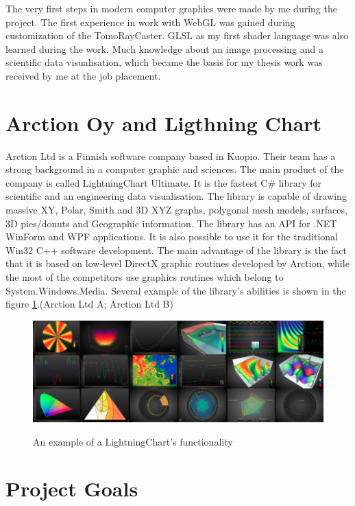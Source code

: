\documentclass[twoside, english, 11pt]{report}
\begin{document}
The very first steps in modern computer graphics were made by me during the project. The first experience in work with WebGL was gained during customization of the TomoRayCaster. GLSL as my first shader language was also learned during the work. Much knowledge about an image processing and a scientific data visualisation, which became the basis for my thesis work was received by me at the job placement.


\section{Arction Oy and Ligthning Chart}

Arction Ltd is a Finnish software company based in Kuopio. Their team has a strong background in a computer graphic and sciences. The main product of the company is called LightningChart Ultimate. It is the fastest C\# library for scientific and an engineering data visualisation. The library is capable of drawing massive XY, Polar, Smith and 3D XYZ graphs, polygonal mesh models, surfaces, 3D pies/donuts and Geographic information. The library has an API for .NET WinForm and WPF applications. It is also possible to use it for the traditional Win32 C++ software development. The main advantage of the library is the fact that it is based on low-level DirectX graphic routines developed by Arction, while the most of the competitors use graphics routines which belong to System.Windows.Media. Several example of the library's abilities is shown in the figure \ref{fig:lchu}.(Arction Ltd A; Arction Ltd B)\\
\begin{figure}[!h]
\includegraphics[scale=0.5]{img/lchu}\\
\caption{An example of a LightningChart's functionality\label{fig:lchu}}
\end{figure}


\section{Project Goals}
\end{document}
